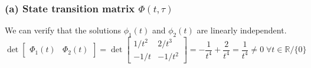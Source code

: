 \subsubsection*{(a) State transition matrix \( \Phi(t,\tau) \)}

We can verify that the solutions \( \phi_1(t) \) and \( \phi_2(t) \) are linearly independent.
\begin{equation*}
    \det \begin{bmatrix}
        \Phi_1(t) & \Phi_2(t)
    \end{bmatrix}
    =
    \det \begin{bmatrix}
        1/t^2 & 2/t^3  \\
        -1/t  & -1/t^2
    \end{bmatrix}
    =
    - \frac{1}{t^4} + \frac{2}{t^4}
    =
    \frac{1}{t^4}
    \neq 0
    \; \forall t \in \mathbb{R}/\{0\}
\end{equation*}

